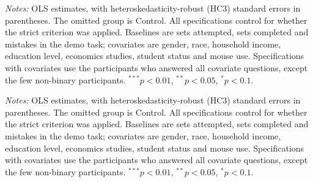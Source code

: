 \documentclass[12pt, letterpaper]{article}
\begin{document}
\begin{table}[htbp]
\centering
\caption{Treatment effects on the mistake rate (pooled sample)}\label{tab:reg-mistakes}
\begin{threeparttable}

\begin{tablenotes}[flushleft]
\footnotesize
\item \textit{Notes:} OLS estimates, with heteroskedasticity-robust (HC3) standard errors in parentheses. The omitted group is Control. All specifications control for whether the strict criterion was applied. Baselines are sets attempted, sets completed and mistakes in the demo task; covariates are gender, race, household income, education level, economics studies, student status and mouse use. Specifications with covariates use the participants who answered all covariate questions, except the few non-binary participants. $^{***}p<0.01$, $^{**}p<0.05$, $^{*}p<0.1$.
\end{tablenotes}
\end{threeparttable}
\end{table}

\begin{table}[htbp]
\centering
\caption{Treatment effects on sets completed (pooled sample)}\label{tab:reg-sets}
\begin{threeparttable}

\begin{tablenotes}[flushleft]
\footnotesize
\item \textit{Notes:} OLS estimates, with heteroskedasticity-robust (HC3) standard errors in parentheses. The omitted group is Control. All specifications control for whether the strict criterion was applied. Baselines are sets attempted, sets completed and mistakes in the demo task; covariates are gender, race, household income, education level, economics studies, student status and mouse use. Specifications with covariates use the participants who answered all covariate questions, except the few non-binary participants. $^{***}p<0.01$, $^{**}p<0.05$, $^{*}p<0.1$.
\end{tablenotes}
\end{threeparttable}
\end{table}
\end{document}
